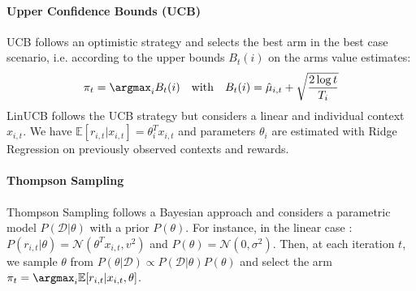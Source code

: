 \paragraph{Upper Confidence Bounds (UCB)}
UCB \cite{auer2002using} follows an optimistic strategy and selects the best arm in the best case scenario, i.e. according to the upper bounds $B_t(i)$ on the arms value estimates:
$$
\pi_t = \argmax_i B_t(i)
\quad \text{with} \quad
B_t(i) = \hat{\mu}_{i,t} + \sqrt{\frac{2 \log t}{T_i}}
$$
LinUCB \cite{li2010contextual} follows the UCB strategy but considers a linear and individual context $x_{i,t}$. We have $\mathbb{E}[r_{i,t} | x_{i,t}] = \theta_i^T x_{i,t}$ and parameters $\theta_i$ are estimated with Ridge Regression on previously observed contexts and rewards.

\paragraph{Thompson Sampling}
Thompson Sampling \cite{kaufmann2012thompson} follows a Bayesian approach and considers a parametric model $P(\mathcal{D} | \theta)$ with a prior $P(\theta)$. For instance, in the linear case \cite{agrawal2013thompson}: $P(r_{i,t} | \theta) = \mathcal{N}(\theta^T x_{i,t}, v^2)$ and $P(\theta) = \mathcal{N}(0, \sigma^2)$. Then, at each iteration $t$, we sample $\theta$ from $P(\theta | \mathcal{D}) \propto P(\mathcal{D}|\theta) P(\theta)$ and select the arm $\pi_t = \argmax_i \mathbb{E}[r_{i,t} | x_{i,t}, \theta]$.